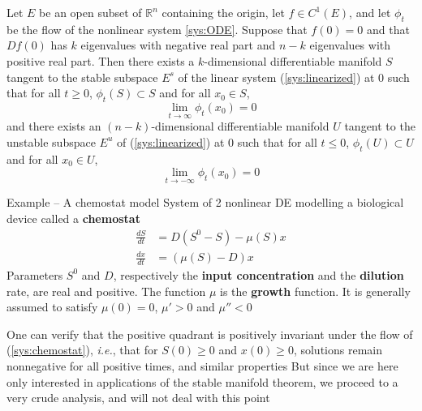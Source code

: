 \documentclass{beamer}
\def\IR{\mathbb{R}}
\def\ie{\emph{i.e.}}
\def\defword#1{\textbf{#1}}
\begin{document}
\begin{frame}
\begin{theorem}\label{th:stable_manifold}
Let $E$ be an open subset of $\IR^n$ containing the origin, let $f\in
C^1(E)$, and let $\phi_t$ be the flow of the nonlinear system
\eqref{sys:ODE}. Suppose that $f(0)=0$ and that $Df(0)$ has $k$
eigenvalues with negative real part and $n-k$ eigenvalues with
positive real part. Then there exists a $k$-dimensional differentiable
manifold $S$ tangent to the stable subspace $E^s$ of the linear system
(\ref{sys:linearized}) at 0 such that for all $t\geq 0$,
$\phi_t(S)\subset S$ and for all $x_0\in S$,
\[
\lim_{t\to\infty} \phi_t(x_0)=0
\]
and there exists an $(n-k)$-dimensional differentiable manifold $U$
tangent to the unstable subspace $E^u$ of (\ref{sys:linearized}) at 0
such that for all $t\leq 0$, $\phi_t(U)\subset U$ and for all $x_0\in
U$,
\[
\lim_{t\to-\infty}\phi_t(x_0)=0
\]
\end{theorem}
\end{frame}

\begin{frame}{Example -- A chemostat model}
System of 2 nonlinear DE modelling a biological device called a \defword{chemostat}
\begin{subequations}
\label{sys:chemostat}
\begin{align}
\frac{dS}{dt} &= D\left(S^0-S\right)-\mu(S)x \label{sys:chemostatS} \\
\frac{dx}{dt} &= (\mu(S)-D)x \label{sys:chemostatx}
\end{align}
\end{subequations}
Parameters $S^0$ and $D$, respectively the \defword{input concentration} and the \defword{dilution} rate, are real and positive.
The function $\mu$ is the \defword{growth} function. It is generally
assumed to satisfy $\mu(0)=0$, $\mu'>0$ and $\mu''<0$
\end{frame}

\begin{frame}
One can verify that the positive quadrant is
positively invariant under the flow of (\ref{sys:chemostat}),
\ie, that for $S(0)\geq 0$ and $x(0)\geq 0$, solutions remain nonnegative for all positive times, and similar properties
\vfill
But since we are here only interested in applications of the stable
manifold theorem, we proceed to a very crude analysis, and will not
deal with this point
\end{frame}
\end{document}
